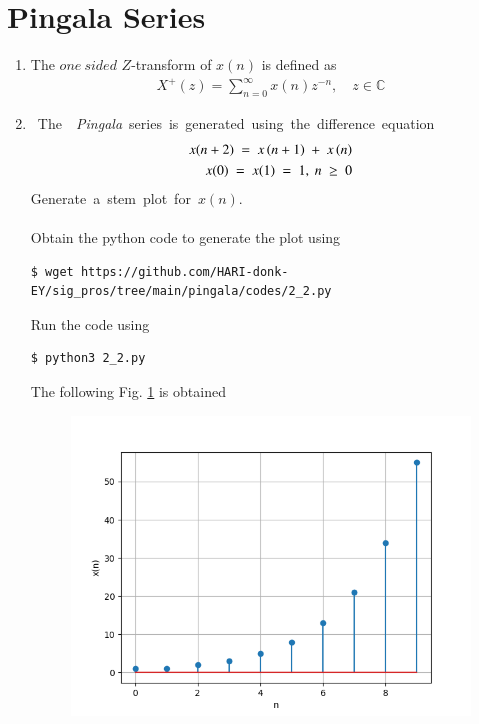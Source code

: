 \documentclass[journal,12pt,twocolumn]{IEEEtran}
\renewcommand\thesection{\arabic{section}}
\begin{document}
\section{Pingala Series}
\begin{enumerate}[label=\thesection.\arabic*,ref=\thesection.\theenumi]
	
	\item The $one\ sided$ $Z$-transform of $x(n)$ is defined as
		\begin{align}
			X^+(z) = \sum_{n=0}^\infty x(n)z^{-n}, \quad z \in \mathbb{C}
			\label{eq:one-Z}
		\end{align}

	\item The {\em Pingala} series is generated using the difference equation  
		\begin{align} 
			x(n+2) = x\brak{n+1} + x\brak{n}\\ 
			x(0) = x(1) = 1, n \ge 0 
			\label{eq:10-pingala} 
		\end{align} 
		Generate a stem plot for $x(n)$.\\

	\solution\\
		Obtain the python code to generate the plot using 
		\begin{lstlisting}
$ wget https://github.com/HARI-donk-EY/sig_pros/tree/main/pingala/codes/2_2.py
		\end{lstlisting}
		Run the code using 
		\begin{lstlisting}
$ python3 2_2.py
		\end{lstlisting}
		The following Fig. \ref{fig:2.2} is obtained
		\begin{figure}[ht]
			\begin{center}
				\includegraphics[width=0.7\columnwidth]{figs/2_2}
			\end{center}
			\label{fig:2.2}    
		\end{figure}


\end{enumerate}
\end{document}
